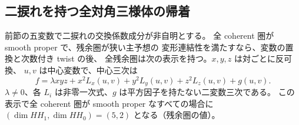 \subsection{二捩れを持つ全対角三様体の帰着}
\label{nds:sec:signs}
\begin{theorem}\label{nds:thm:signs}
前節の五変数で二捩れの交換係数成分が非自明とする。
全 coherent 圏が smooth proper で、残余圏が狭い主予想の
変形連結性を満たすなら、変数の置換と次数付き twist の後、
全残余圏は次の表示を持つ。$x,y,z$ は対ごとに反可換、
$u,v$ は中心変数で、中心三次は
\[
 f=\lambda xyz+x^2L_x(u,v)+y^2L_y(u,v)+z^2L_z(u,v)+g(u,v).
\]
$\lambda\ne0$、各 $L_i$ は非零一次式、$g$ は平方因子を持たない二変数三次である。
この表示で全 coherent 圏が smooth proper なすべての場合に
$(\dim HH_1,\dim HH_0)=(5,2)$ となる（残余圏の値）。
\end{theorem}
